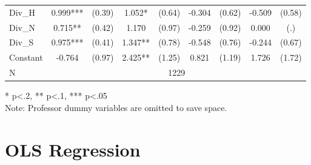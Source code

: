 \begin{sidewaystable}[htb]
\begin{threeparttable}
\begin{tabular}{l|c|c|c|c|c|c|c|c}
      Div\_H            & 0.999***                     & (0.39)                       & 1.052*                      & (0.64)               & -0.304               & (0.62)               & -0.509               & (0.58)               \\
      Div\_N            & 0.715**                      & (0.42)                       & 1.170                       & (0.97)               & -0.259               & (0.92)               & 0.000                & (.)                  \\
      Div\_S            & 0.975***                     & (0.41)                       & 1.347**                     & (0.78)               & -0.548               & (0.76)               & -0.244               & (0.67)               \\
      Constant          & -0.764                       & (0.97)                       & 2.425**                     & (1.25)               & 0.821                & (1.19)               & 1.726                & (1.72)               \\      
      \hline
      N & \multicolumn{8}{|c}{1229} \\
      \hline
      \hline
    \end{tabular}
    \begin{tablenotes}
    \item{* p<.2, ** p<.1, *** p<.05 \\ Note: Professor dummy variables are omitted to save space.}
    \end{tablenotes}
  \end{threeparttable}
\end{sidewaystable}

\clearpage{}

\section{OLS Regression}\label{appendix:c}
